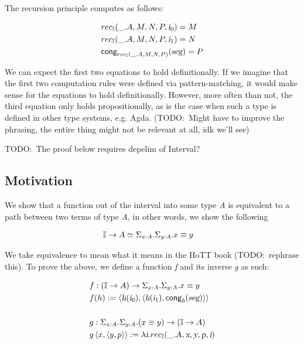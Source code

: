 \documentclass[11pt]{article}
\newcommand \kw[1] {\textsf{#1}}
\newcommand \id[1] {\textsl{#1}}
\begin{document}
The recursion principle computes as follows:

\begin{align*}
  & rec_{\bI}(\_ . A, M, N, P, \ileft) = M \\
  & rec_{\bI}(\_ . A, M, N, P, \iright) = N \\
  & \kw{cong}_{rec_{\bI}(\_ . A, M, N, P)}(\id{seg}) = P
\end{align*}

We can expect the first two equations to hold definitionally. If we imagine that the first two computation rules were defined via pattern-matching, it would make sense for the equations to hold definitionally. However, more often than not, the third equation only holds propositionally, as is the case when such a type is defined in other type systems, e.g. Agda. (TODO:\ Might have to improve the phrasing, the entire thing might not be relevant at all, idk we'll see)

TODO:\ The proof below requires depelim of Interval?

\subsection{Motivation}
We show that a function out of the interval into some type \id{A} is equivalent to a path between two terms of type \id{A}, in other words, we show the following

\begin{align*}
  & \bI \rightarrow A \simeq \Sigma_{\oftype{x}{A}} . \Sigma_{\oftype{y}{A}} . \eqtype{x}{y}
\end{align*}

We take equivalence to mean what it means in the HoTT book (TODO:\ rephrase this). To prove the above, we define a function \id{f} and its inverse \id{g} as such:

\begin{align*}
  & f : (\bI \rightarrow A) \rightarrow \Sigma_{\oftype{x}{A}} . \Sigma_{\oftype{y}{A}} . \eqtype{x}{y} \\
  & f(h) := \braket{\id{h}(\ileft), \braket{\id{h}(\iright), \kw{cong}_{\id{h}}(\id{seg})}} \\ \\
  & g : \Sigma_{\oftype{x}{A}} . \Sigma_{\oftype{y}{A}} . (\eqtype{x}{y}) \rightarrow  (\bI \rightarrow A) \\
  & g \braket{x, \braket{y, p}} := \lambda \id{i} . rec_{\bI}(\_ . \id{A}, \id{x}, \id{y}, \id{p}, \id{i})
\end{align*}
\end{document}
